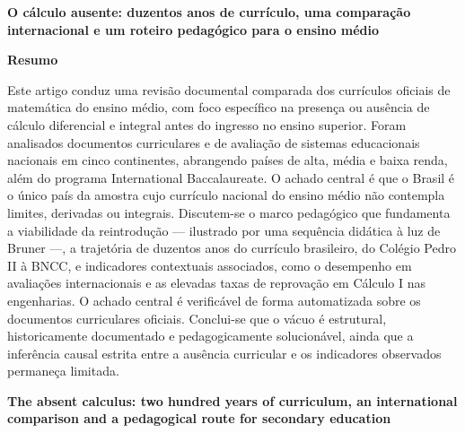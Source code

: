 \documentclass[12pt,a4paper,oneside]{article}
\begin{document}
\begin{center}
{\fontsize{16}{19}\selectfont\bfseries O cálculo ausente: duzentos anos de
currículo, uma comparação internacional e um roteiro pedagógico para o
ensino médio}
\end{center}

\vspace{4pt}

{\centering\textbf{Resumo}\par}\vspace{2pt}
{\small\noindent
Este artigo conduz uma revisão documental comparada dos currículos
oficiais de matemática do ensino médio, com foco específico na presença
ou ausência de cálculo diferencial e integral antes do ingresso no
ensino superior. Foram analisados documentos curriculares e de avaliação
de sistemas educacionais nacionais em cinco continentes, abrangendo
países de alta, média e baixa renda, além do programa International
Baccalaureate. O achado central é que o Brasil é o único país da amostra
cujo currículo nacional do ensino médio não contempla limites, derivadas
ou integrais. Discutem-se o marco pedagógico que fundamenta a
viabilidade da reintrodução --- ilustrado por uma sequência didática à luz
de Bruner ---, a trajetória
de duzentos anos do currículo brasileiro, do Colégio Pedro II à BNCC, e
indicadores contextuais associados, como o desempenho em avaliações
internacionais e as elevadas taxas de reprovação em Cálculo I nas
engenharias. O achado central é verificável de forma automatizada sobre os
documentos curriculares oficiais. Conclui-se que o vácuo é estrutural, historicamente
documentado e pedagogicamente solucionável, ainda que a inferência
causal estrita entre a ausência curricular e os indicadores observados
permaneça limitada.\par}

\smallskip
{}

\medskip

\begin{center}
{\fontsize{14}{17}\selectfont\bfseries The absent calculus: two hundred years of curriculum, an
international comparison and a pedagogical route for secondary education}
\end{center}
\vspace{2pt}
\end{document}
